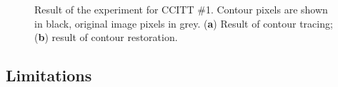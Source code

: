 \documentclass[sensors,article,accept,moreauthors,pdftex,10pt,a4paper]{mdpi}
\begin{document}
\begin{figure}[H]
	\centering
	 
	\caption{Result of the experiment for CCITT \#1. Contour pixels are shown in black, original image pixels in grey. (\textbf{a}) Result of contour tracing; (\textbf{b}) result of contour restoration.}
	\label{fig:image20}
\end{figure}



\subsection{Limitations}
\end{document}
